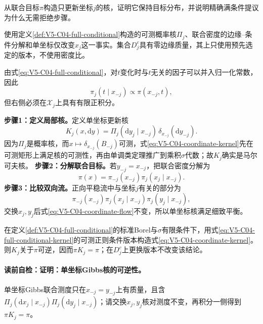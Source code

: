 \begin{derivationgoalbox}
从联合目标$\pi$构造只更新坐标$j$的核，证明它保持目标分布，并说明精确满条件提议为什么无需\MetropolisHastings{}拒绝步骤。
\end{derivationgoalbox}

\begin{derivationprepbox}
使用定义\ref{def:V5-C04-full-conditional}构造的可测概率核$\Pi_j$、联合密度的边缘--条件分解和单坐标仅改变$x_j$这一事实。集合$D_j^c$具有零边缘质量，其上只使用预先选定的版本，不使用密度比。
\end{derivationprepbox}
由式\eqref{eq:V5-C04-full-conditional}，对$t$变化时与$t$无关的因子可以并入归一化常数，因此
\begin{equation}\label{eq:V5-C04-conditional-proportional}
\pi_j(t\mid x_{-j})\propto\pi(x_{-j},t),
\end{equation}
但右侧必须在$\mathcal X_j$上具有有限正积分。

\textbf{步骤1：定义局部核。}定义单坐标更新核
\begin{equation}\label{eq:V5-C04-coordinate-kernel}
K_j(x,\mathrm dy)
=\Pi_j(\mathrm dy_j\mid x_{-j})
\,\delta_{x_{-j}}(\mathrm dy_{-j}).
\end{equation}
因为$\Pi_j$是概率核，而$x\mapsto\delta_{x_{-j}}(B_{-j})$可测，式\eqref{eq:V5-C04-coordinate-kernel}先在可测矩形上满足核的可测性，再由单调类定理推广到乘积$\sigma$代数；故$K_j$确实是马尔可夫核。
\textbf{步骤2：分解联合目标。}若$y_{-j}=x_{-j}$，把联合密度分解为
\[
\pi(x)=\pi_{-j}(x_{-j})\pi_j(x_j\mid x_{-j}).
\]
\textbf{步骤3：比较双向流。}正向平稳流中与坐标$j$有关的部分为
\begin{equation}\label{eq:V5-C04-coordinate-flow}
\pi_{-j}(x_{-j})
\pi_j(x_j\mid x_{-j})
\pi_j(y_j\mid x_{-j}),
\end{equation}
交换$x_j,y_j$后式\eqref{eq:V5-C04-coordinate-flow}不变，所以单坐标核满足细致平衡。

\label{struct:V5-C04-CH12}
\begin{theorem}[单坐标Gibbs核的可逆性]\label{thm:V5-C04-coordinate-reversible}
在定义\ref{def:V5-C04-full-conditional}的标准Borel与$\sigma$有限条件下，用式\eqref{eq:V5-C04-full-conditional-kernel}的可测正则条件版本构造式\eqref{eq:V5-C04-coordinate-kernel}。则$K_j$关于$\pi$可逆，因而$\pi K_j=\pi$；在$D_j^c$上更换版本不改变该结论。
\end{theorem}

\label{struct:V5-C04-CH13}
\paragraph{读前自检：证明：单坐标Gibbs核的可逆性。}单坐标Gibbs联合测度只在$x_{-j}=y_{-j}$上有质量，且含$\Pi_j(\mathrm dx_j\mid x_{-j})\Pi_j(\mathrm dy_j\mid x_{-j})$；请交换$x_j,y_j$核对测度不变，再积分一侧得到$\pi K_j=\pi$。\par

